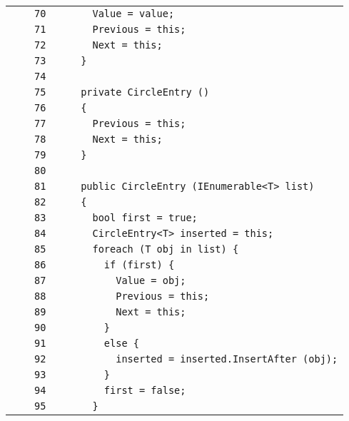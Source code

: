 \documentclass[a4paper,10pt]{article}
\begin{document}
\begin{longtable}[l]{lrrl}
\cellcolor{gray} &  & \verb~70~ & \verb~      Value = value;~\\
\cellcolor{gray} &  & \verb~71~ & \verb~      Previous = this;~\\
\cellcolor{gray} &  & \verb~72~ & \verb~      Next = this;~\\
\cellcolor{gray} &  & \verb~73~ & \verb~    }~\\
\cellcolor{gray} &  & \verb~74~ & \verb~~\\
\cellcolor{gray} &  & \verb~75~ & \verb~    private CircleEntry ()~\\
\cellcolor{gray} &  & \verb~76~ & \verb~    {~\\
\cellcolor{gray} &  & \verb~77~ & \verb~      Previous = this;~\\
\cellcolor{gray} &  & \verb~78~ & \verb~      Next = this;~\\
\cellcolor{gray} &  & \verb~79~ & \verb~    }~\\
\cellcolor{gray} &  & \verb~80~ & \verb~~\\
\cellcolor{gray} &  & \verb~81~ & \verb~    public CircleEntry (IEnumerable<T> list)~\\
\cellcolor{gray} &  & \verb~82~ & \verb~    {~\\
\cellcolor{gray} &  & \verb~83~ & \verb~      bool first = true;~\\
\cellcolor{gray} &  & \verb~84~ & \verb~      CircleEntry<T> inserted = this;~\\
\cellcolor{gray} &  & \verb~85~ & \verb~      foreach (T obj in list) {~\\
\cellcolor{gray} &  & \verb~86~ & \verb~        if (first) {~\\
\cellcolor{gray} &  & \verb~87~ & \verb~          Value = obj;~\\
\cellcolor{gray} &  & \verb~88~ & \verb~          Previous = this;~\\
\cellcolor{gray} &  & \verb~89~ & \verb~          Next = this;~\\
\cellcolor{gray} &  & \verb~90~ & \verb~        }~\\
\cellcolor{gray} &  & \verb~91~ & \verb~        else {~\\
\cellcolor{gray} &  & \verb~92~ & \verb~          inserted = inserted.InsertAfter (obj);~\\
\cellcolor{gray} &  & \verb~93~ & \verb~        }~\\
\cellcolor{gray} &  & \verb~94~ & \verb~        first = false;~\\
\cellcolor{gray} &  & \verb~95~ & \verb~      }~\\

\end{longtable}
\end{document}
